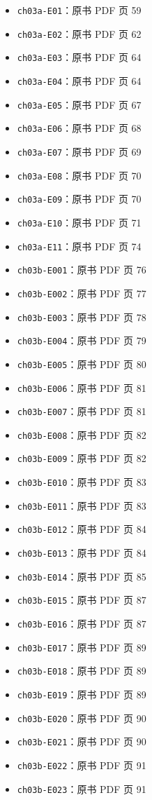 \documentclass[
  10pt,
  fontset=fandol]{ctexart}
\providecommand{\tightlist}{%
  \setlength{\itemsep}{0pt}\setlength{\parskip}{0pt}}
\begin{document}
\begin{itemize}
\tightlist
\item
  \texttt{ch03a-E01}：原书 PDF 页 59
\item
  \texttt{ch03a-E02}：原书 PDF 页 62
\item
  \texttt{ch03a-E03}：原书 PDF 页 64
\item
  \texttt{ch03a-E04}：原书 PDF 页 64
\item
  \texttt{ch03a-E05}：原书 PDF 页 67
\item
  \texttt{ch03a-E06}：原书 PDF 页 68
\item
  \texttt{ch03a-E07}：原书 PDF 页 69
\item
  \texttt{ch03a-E08}：原书 PDF 页 70
\item
  \texttt{ch03a-E09}：原书 PDF 页 70
\item
  \texttt{ch03a-E10}：原书 PDF 页 71
\item
  \texttt{ch03a-E11}：原书 PDF 页 74
\item
  \texttt{ch03b-E001}：原书 PDF 页 76
\item
  \texttt{ch03b-E002}：原书 PDF 页 77
\item
  \texttt{ch03b-E003}：原书 PDF 页 78
\item
  \texttt{ch03b-E004}：原书 PDF 页 79
\item
  \texttt{ch03b-E005}：原书 PDF 页 80
\item
  \texttt{ch03b-E006}：原书 PDF 页 81
\item
  \texttt{ch03b-E007}：原书 PDF 页 81
\item
  \texttt{ch03b-E008}：原书 PDF 页 82
\item
  \texttt{ch03b-E009}：原书 PDF 页 82
\item
  \texttt{ch03b-E010}：原书 PDF 页 83
\item
  \texttt{ch03b-E011}：原书 PDF 页 83
\item
  \texttt{ch03b-E012}：原书 PDF 页 84
\item
  \texttt{ch03b-E013}：原书 PDF 页 84
\item
  \texttt{ch03b-E014}：原书 PDF 页 85
\item
  \texttt{ch03b-E015}：原书 PDF 页 87
\item
  \texttt{ch03b-E016}：原书 PDF 页 87
\item
  \texttt{ch03b-E017}：原书 PDF 页 89
\item
  \texttt{ch03b-E018}：原书 PDF 页 89
\item
  \texttt{ch03b-E019}：原书 PDF 页 89
\item
  \texttt{ch03b-E020}：原书 PDF 页 90
\item
  \texttt{ch03b-E021}：原书 PDF 页 90
\item
  \texttt{ch03b-E022}：原书 PDF 页 91
\item
  \texttt{ch03b-E023}：原书 PDF 页 91
\end{itemize}
\end{document}
